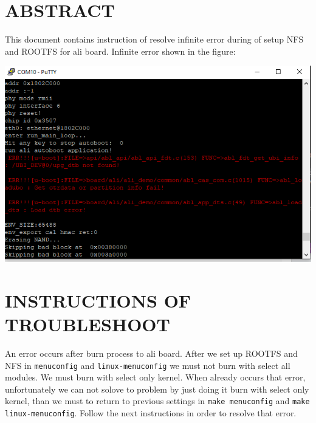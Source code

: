 \documentclass[12pt]{report}
\newcommand{\code}[1]{\texttt{#1}} %
\begin{document}
\section*{ABSTRACT}
This document contains instruction of resolve infinite error during of setup NFS and ROOTFS for ali board.
Infinite error shown in the figure:
\begin{center}
    \includegraphics[scale=0.8]{error1.PNG}
\end{center}


\newpage


\section{INSTRUCTIONS OF TROUBLESHOOT}

An error occurs after burn process to ali board.
After we set up ROOTFS and NFS in \code{menuconfig} and \code{linux-menuconfig} we must not burn with select all modules.
We must burn with select only kernel.
When already occurs that error, unfortunately we can not solove to problem by just doing it burn with select only kernel, than we must to return to previous settings in \code{make menuconfig} and \code{make linux-menuconfig}.
Follow the next instructions in order to resolve that error.
\newline
\end{document}
